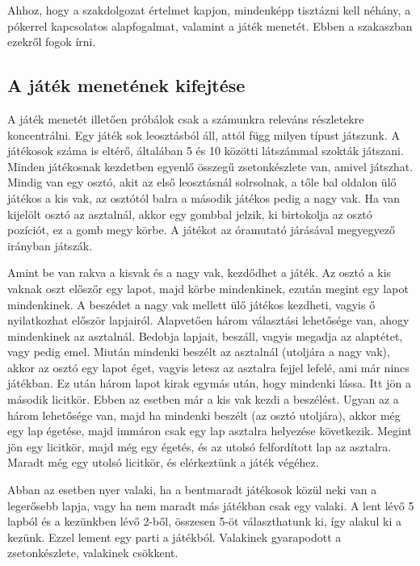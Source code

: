 
Ahhoz, hogy a szakdolgozat értelmet kapjon, mindenképp tisztázni kell néhány, a pókerrel kapcsolatos alapfogalmat, valamint a játék menetét. Ebben a szakaszban ezekről fogok írni.

\subsection{A játék menetének kifejtése}
A játék menetét illetően próbálok csak a számunkra releváns részletekre koncentrálni. Egy játék sok leosztásból áll, attól függ milyen típust játszunk. A játékosok száma is eltérő, általában 5 és 10 közötti látszámmal szokták játszani. Minden játékosnak kezdetben egyenlő összegű zsetonkészlete van, amivel játszhat. Mindig van egy osztó, akit az első leosztásnál solrsolnak, a tőle bal oldalon ülő játékos a kis vak, az osztótól balra a második játékos pedig a nagy vak. Ha van kijelölt osztó az asztalnál, akkor egy gombbal jelzik, ki birtokolja az osztó pozíciót, ez a gomb megy körbe. A játékot az óramutató járásával megyegyező irányban játszák. %

Amint be van rakva a kisvak és a nagy vak, kezdődhet a játék. Az osztó a kis vaknak oszt előszőr egy lapot, majd körbe mindenkinek, ezután megint egy lapot mindenkinek. A beszédet a nagy vak mellett ülő játékos kezdheti, vagyis ő nyilatkozhat először lapjairól. Alapvetően három választási lehetősége van, ahogy mindenkinek az asztalnál. Bedobja lapjait, beszáll, vagyis megadja az alaptétet, vagy pedig emel. Miután mindenki beszélt az asztalnál (utoljára a nagy vak),%
 akkor az osztó egy lapot éget, vagyis letesz az asztalra fejjel lefelé, ami már nincs játékban. Ez után három lapot kirak egymás után, hogy mindenki lássa. Itt jön a második licitkör. Ebben az esetben már a kis vak kezdi a beszélést. Ugyan az a három lehetősége van, majd ha mindenki beszélt (az osztó utoljára), %
  akkor még egy lap égetése, majd immáron csak egy lap asztalra helyezése következik. Megint jön egy licitkör, majd még egy égetés, és az utolsó felfordított lap az asztalra. Maradt még egy utolsó licitkör, és elérkeztünk a játék végéhez.

Abban az esetben nyer valaki, ha a bentmaradt játékosok közül neki van a legerősebb lapja, vagy ha nem maradt más játékban csak egy valaki. A lent lévő 5 lapból és a kezünkben lévő 2-ből, összesen 5-öt választhatunk ki, így alakul ki a kezünk. Ezzel lement egy parti a játékból. Valakinek gyarapodott a zsetonkészlete, valakinek csökkent. %

